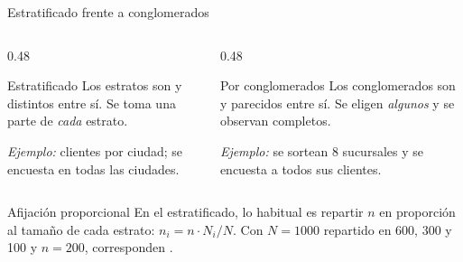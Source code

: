 \documentclass[aspectratio=169,10pt]{beamer}
\begin{document}
\begin{frame}{Estratificado frente a conglomerados}
  \begin{columns}[T,onlytextwidth]
    \begin{column}{0.48\textwidth}
      \begin{block}{Estratificado}
        \footnotesize
        Los estratos son  y distintos entre sí.
        Se toma una parte de \emph{cada} estrato.

        \vspace{0.15cm}
        \emph{Ejemplo:} clientes por ciudad; se encuesta en todas las ciudades.
      \end{block}
    \end{column}
    \begin{column}{0.48\textwidth}
      \begin{exampleblock}{Por conglomerados}
        \footnotesize
        Los conglomerados son  y parecidos entre
        sí. Se eligen \emph{algunos} y se observan completos.

        \vspace{0.15cm}
        \emph{Ejemplo:} se sortean 8 sucursales y se encuesta a todos sus
        clientes.
      \end{exampleblock}
    \end{column}
  \end{columns}

  \vspace{0.25cm}
  \begin{alertblock}{Afijación proporcional}
    \footnotesize
    En el estratificado, lo habitual es repartir $n$ en proporción al tamaño de
    cada estrato: $n_i = n\cdot N_i/N$. Con $N=1000$ repartido en 600, 300 y 100
    y $n=200$, corresponden .
  \end{alertblock}
\end{frame}
\end{document}
